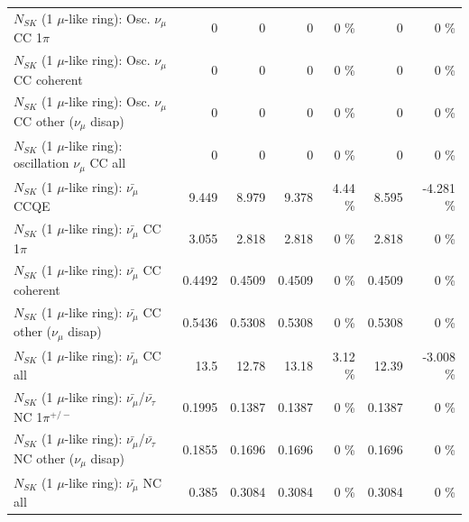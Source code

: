 \begin{table}
\begin{tabular}{| l | r | r | r  r | r  r |}
                          $N_{SK}$ (1 $\mu$-like ring): Osc. $\nu_\mu$ CC 1$\pi$ &               0 &               0 &               0 &        0 \%  &               0 &        0 \%  \\ 
                        $N_{SK}$ (1 $\mu$-like ring): Osc. $\nu_\mu$ CC coherent &               0 &               0 &               0 &        0 \%  &               0 &        0 \%  \\ 
         $N_{SK}$ (1 $\mu$-like ring): Osc. $\nu_\mu$ CC other ($\nu_\mu$ disap) &               0 &               0 &               0 &        0 \%  &               0 &        0 \%  \\ 
                      $N_{SK}$ (1 $\mu$-like ring): oscillation $\nu_\mu$ CC all &               0 &               0 &               0 &        0 \%  &               0 &        0 \%  \\ 
\hline
\hline
                              $N_{SK}$ (1 $\mu$-like ring): $\bar{\nu_\mu}$ CCQE &           9.449 &           8.979 &           9.378 &     4.44 \%  &           8.595 &   -4.281 \%  \\ 
                         $N_{SK}$ (1 $\mu$-like ring): $\bar{\nu_\mu}$ CC 1$\pi$ &           3.055 &           2.818 &           2.818 &        0 \%  &           2.818 &        0 \%  \\ 
                       $N_{SK}$ (1 $\mu$-like ring): $\bar{\nu_\mu}$ CC coherent &          0.4492 &          0.4509 &          0.4509 &        0 \%  &          0.4509 &        0 \%  \\ 
        $N_{SK}$ (1 $\mu$-like ring): $\bar{\nu_\mu}$ CC other ($\nu_\mu$ disap) &          0.5436 &          0.5308 &          0.5308 &        0 \%  &          0.5308 &        0 \%  \\ 
                          $N_{SK}$ (1 $\mu$-like ring): $\bar{\nu_{\mu}}$ CC all &            13.5 &           12.78 &           13.18 &     3.12 \%  &           12.39 &   -3.008 \%  \\ 
\hline
  $N_{SK}$ (1 $\mu$-like ring): $\bar{\nu_\mu}$/$\bar{\nu_\tau}$ NC 1$\pi^{+/-}$ &          0.1995 &          0.1387 &          0.1387 &        0 \%  &          0.1387 &        0 \%  \\ 
$N_{SK}$ (1 $\mu$-like ring): $\bar{\nu_\mu}$/$\bar{\nu_\tau}$ NC other ($\nu_\mu$ disap) &          0.1855 &          0.1696 &          0.1696 &        0 \%  &          0.1696 &        0 \%  \\ 
                          $N_{SK}$ (1 $\mu$-like ring): $\bar{\nu_{\mu}}$ NC all &           0.385 &          0.3084 &          0.3084 &        0 \%  &          0.3084 &        0 \%  \\ 

\end{tabular}
\end{table}
